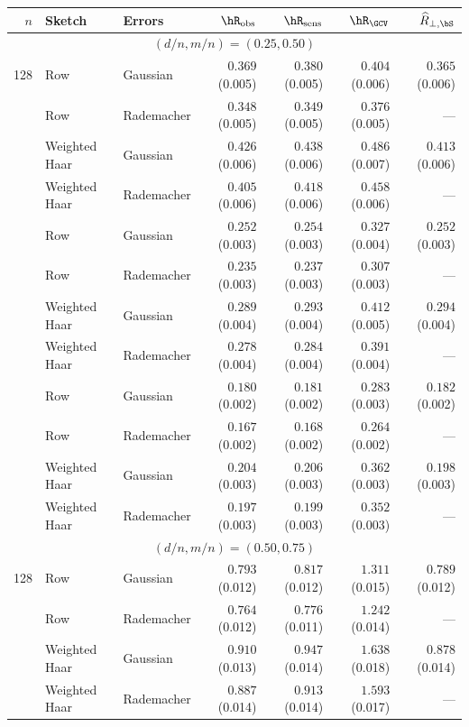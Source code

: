 \begin{tabular}{@{}rllrrrr@{}}
\toprule
 $n$ & Sketch & Errors & $\hR_{\mathrm{obs}}$ & $\hR_{\mathrm{sens}}$ & $\hR_{\GCV}$ & $\widehat R_{\perp,\bS}$ \\
\midrule
\multicolumn{7}{c}{$(d/n,m/n)=(0.25,0.50)$} \\
\midrule
128 & Row & Gaussian & $0.369$ (0.005) & $0.380$ (0.005) & $0.404$ (0.006) & $0.365$ (0.006) \\
 & Row & Rademacher & $0.348$ (0.005) & $0.349$ (0.005) & $0.376$ (0.005) & --- \\
 & Weighted Haar & Gaussian & $0.426$ (0.006) & $0.438$ (0.006) & $0.486$ (0.007) & $0.413$ (0.006) \\
 & Weighted Haar & Rademacher & $0.405$ (0.006) & $0.418$ (0.006) & $0.458$ (0.006) & --- \\
\addlinespace[3pt]
256 & Row & Gaussian & $0.252$ (0.003) & $0.254$ (0.003) & $0.327$ (0.004) & $0.252$ (0.003) \\
 & Row & Rademacher & $0.235$ (0.003) & $0.237$ (0.003) & $0.307$ (0.003) & --- \\
 & Weighted Haar & Gaussian & $0.289$ (0.004) & $0.293$ (0.004) & $0.412$ (0.005) & $0.294$ (0.004) \\
 & Weighted Haar & Rademacher & $0.278$ (0.004) & $0.284$ (0.004) & $0.391$ (0.004) & --- \\
\addlinespace[3pt]
512 & Row & Gaussian & $0.180$ (0.002) & $0.181$ (0.002) & $0.283$ (0.003) & $0.182$ (0.002) \\
 & Row & Rademacher & $0.167$ (0.002) & $0.168$ (0.002) & $0.264$ (0.002) & --- \\
 & Weighted Haar & Gaussian & $0.204$ (0.003) & $0.206$ (0.003) & $0.362$ (0.003) & $0.198$ (0.003) \\
 & Weighted Haar & Rademacher & $0.197$ (0.003) & $0.199$ (0.003) & $0.352$ (0.003) & --- \\
\midrule
\multicolumn{7}{c}{$(d/n,m/n)=(0.50,0.75)$} \\
\midrule
128 & Row & Gaussian & $0.793$ (0.012) & $0.817$ (0.012) & $1.311$ (0.015) & $0.789$ (0.012) \\
 & Row & Rademacher & $0.764$ (0.012) & $0.776$ (0.011) & $1.242$ (0.014) & --- \\
 & Weighted Haar & Gaussian & $0.910$ (0.013) & $0.947$ (0.014) & $1.638$ (0.018) & $0.878$ (0.014) \\
 & Weighted Haar & Rademacher & $0.887$ (0.014) & $0.913$ (0.014) & $1.593$ (0.017) & --- \\

\end{tabular}
